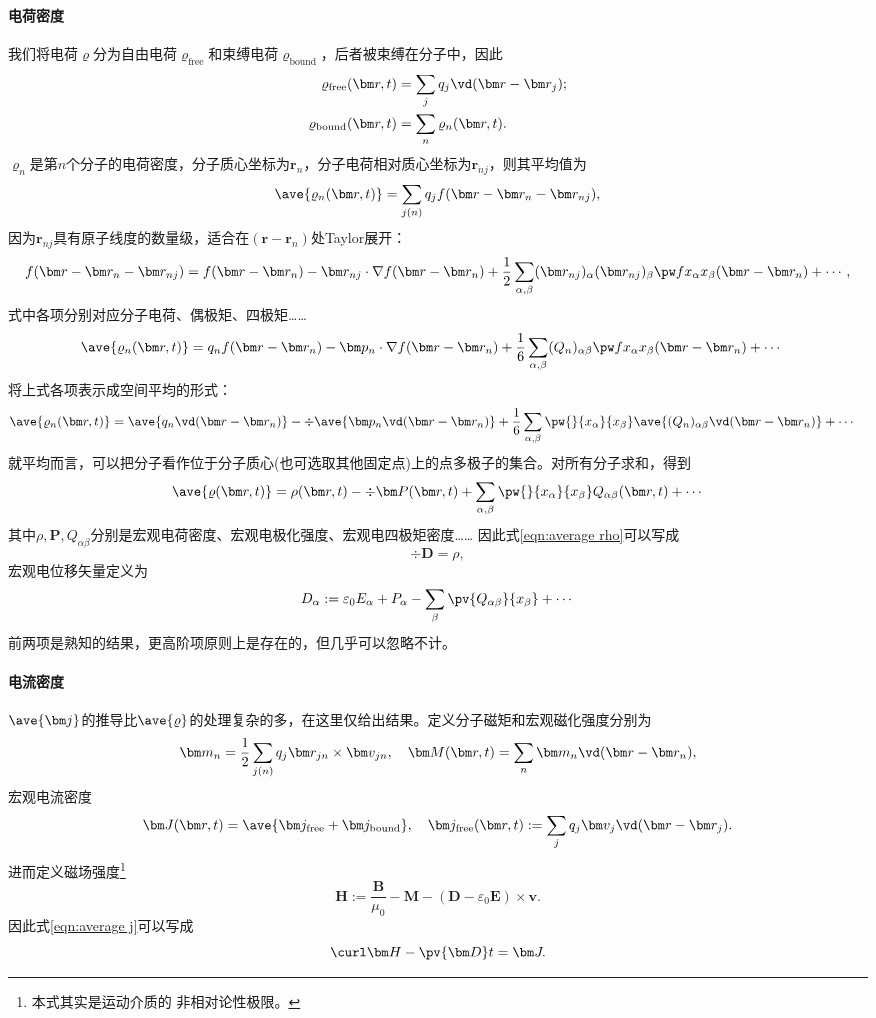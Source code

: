 \paragraph{电荷密度}
我们将电荷$\varrho$分为自由电荷$\varrho_\text{free}$和束缚电荷$\varrho_\text{bound}$，后者被束缚在分子中，因此
\begin{align*}
    \varrho_\text{free}(\bm r,t)&=\sum_jq_j\vd(\bm r-\bm r_j);\\
    \varrho_\text{bound}(\bm r,t)&=\sum_n\varrho_n(\bm r,t).
\end{align*}
$\varrho_n$是第$n$个分子的电荷密度，分子质心坐标为$\bm r_n$，分子电荷相对质心坐标为$\bm r_{nj}$，则其平均值为
\[
    \ave{\varrho_n(\bm r,t)}=\sum_{j(n)}q_jf(\bm r-\bm r_n-\bm r_{nj}),
\]
因为$\bm r_{nj}$具有原子线度的数量级，适合在$(\bm r-\bm r_n)$处Taylor展开： 
\[
    f(\bm r-\bm r_n-\bm r_{nj})=f(\bm r-\bm r_n)-\bm r_{nj}\cdot\nabla f(\bm r-\bm r_n)+\frac12\sum_{\alpha,\beta}(\bm r_{nj})_\alpha(\bm r_{nj})_\beta\pw f{x_\alpha}{x_\beta}(\bm r-\bm r_n)+\cdots,
\]
式中各项分别对应分子电荷、偶极矩、四极矩……
\begin{align*}
    \ave{\varrho_n(\bm r,t)}={}&q_nf(\bm r-\bm r_n)-\bm p_n\cdot\nabla f(\bm r-\bm r_n)+\frac16\sum_{\alpha,\beta}(Q_n)_{\alpha\beta}\pw f{x_\alpha}{x_\beta}(\bm r-\bm r_n)+\cdots
\end{align*}
将上式各项表示成空间平均的形式：
\begin{align*}
    \ave{\varrho_n(\bm r,t)}={}&\ave{q_n\vd(\bm r-\bm r_n)}-\div\ave{\bm p_n\vd(\bm r-\bm r_n)}+\frac16\sum_{\alpha,\beta}\pw{}{x_\alpha}{x_\beta}\ave{(Q_n)_{\alpha\beta}\vd(\bm r-\bm r_n)}+\cdots
\end{align*}
就平均而言，可以把分子看作位于分子质心(也可选取其他固定点)上的点多极子的集合。对所有分子求和，得到
\[
    \ave{\varrho(\bm r,t)}=\rho(\bm r,t)-\div\bm P(\bm r,t)+\sum_{\alpha,\beta}\pw{}{x_\alpha}{x_\beta}Q_{\alpha\beta}(\bm r,t)+\cdots
\]
其中$\rho,\bm P,Q_{\alpha\beta}$分别是宏观电荷密度、宏观电极化强度、宏观电四极矩密度……
因此式\eqref{eqn:average rho}可以写成 
\[
    \div\bm D=\rho,
\]
宏观电位移矢量定义为
\[
    D_\alpha:=\varepsilon_0E_\alpha+P_\alpha-\sum_\beta\pv{Q_{\alpha\beta}}{x_\beta}+\cdots
\]
前两项是熟知的结果，更高阶项原则上是存在的，但几乎可以忽略不计。
\paragraph{电流密度}
$\ave{\bm j}$的推导比$\ave{\varrho}$的处理复杂的多，在这里仅给出结果。定义分子磁矩和宏观磁化强度分别为
\[
    \bm m_n=\frac12\sum_{j(n)}q_j\bm r_{jn}\times\bm v_{jn},\quad\bm M(\bm r,t)=\sum_n\bm m_n\vd(\bm r-\bm r_n),
\]
宏观电流密度
\[
    \bm J(\bm r,t)=\ave{\bm j_\text{free}+\bm j_\text{bound}},\quad\bm j_\text{free}(\bm r,t):=\sum_jq_j\bm v_j\vd(\bm r-\bm r_j).
\]
进而定义磁场强度\footnote{本式其实是运动介质的%
非相对论性极限。}
\[
    \bm H:=\frac{\bm B}{\mu_0}-\bm M-(\bm D-\varepsilon_0\bm E)\times\bm v.
\]
因此式\eqref{eqn:average j}可以写成
\[
    \curl\bm H-\pv{\bm D}t=\bm J.
\] 

